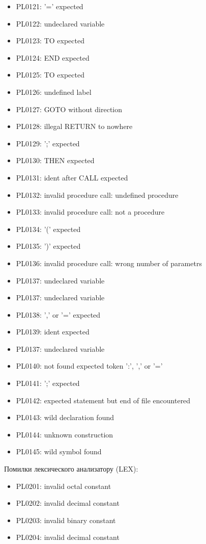 \documentclass{memoir}
\begin{document}
\begin{itemize}
\item PL0121: '=' expected
\item PL0122: undeclared variable
\item PL0123: TO expected
\item PL0124: END expected
\item PL0125: TO expected
\item PL0126: undefined label
\item PL0127: GOTO without direction
\item PL0128: illegal RETURN to nowhere
\item PL0129: ';' expected
\item PL0130: THEN expected
\item PL0131: ident after CALL expected
\item PL0132: invalid procedure call: undefined procedure
\item PL0133: invalid procedure call: not a procedure
\item PL0134: '(' expected
\item PL0135: ')' expected
\item PL0136: invalid procedure call: wrong number of parametrs
\item PL0137: undeclared variable
\item PL0137: undeclared variable
\item PL0138: ',' or '=' expected
\item PL0139: ident expected
\item PL0137: undeclared variable
\item PL0140: not found expected token ':', ',' or '='
\item PL0141: ';' expected
\item PL0142: expected statement but end of file encountered
\item PL0143: wild declaration found
\item PL0144: unknown construction
\item PL0145: wild symbol found
\end{itemize}

Помилки лексического анализатору (LEX):

\begin{itemize}
\item PL0201: invalid octal constant
\item PL0202: invalid decimal constant
\item PL0203: invalid binary constant
\item PL0204: invalid decimal constant
\end{itemize}
\end{document}
